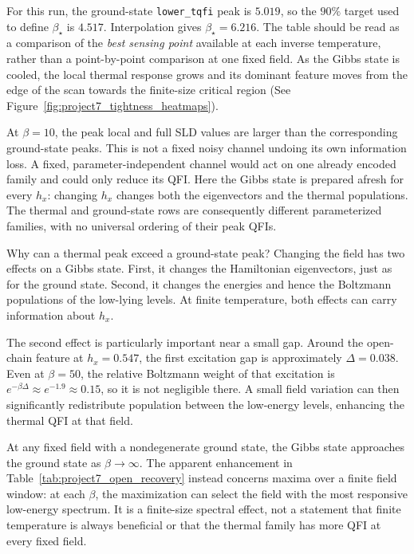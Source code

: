 For this run, the ground-state \texttt{lower\_tqfi} peak is $5.019$, so the $90\%$ target used to define $\beta_\star$ is $4.517$. Interpolation gives $\beta_\star=6.216$. The table should be read as a comparison of the \emph{best sensing point} available at each inverse temperature, rather than a point-by-point comparison at one fixed field. As the Gibbs state is cooled, the local thermal response grows and its dominant feature moves from the edge of the scan towards the finite-size critical region (See Figure~\ref{fig:project7_tightness_heatmaps}).

At $\beta=10$, the peak local and full SLD values are larger than the corresponding ground-state peaks. This is not a fixed noisy channel undoing its own information loss. A fixed, parameter-independent channel would act on one already encoded family and could only reduce its QFI. Here the Gibbs state is prepared afresh for every $h_x$: changing $h_x$ changes both the eigenvectors and the thermal populations. The thermal and ground-state rows are consequently different parameterized families, with no universal ordering of their peak QFIs.

\begin{infobox}{Why can a thermal peak exceed a ground-state peak?}
    Changing the field has two effects on a Gibbs state. First, it changes the Hamiltonian eigenvectors, just as for the ground state. Second, it changes the energies and hence the Boltzmann populations of the low-lying levels. At finite temperature, both effects can carry information about $h_x$.

    The second effect is particularly important near a small gap. Around the open-chain feature at $h_x=0.547$, the first excitation gap is approximately $\Delta=0.038$. Even at $\beta=50$, the relative Boltzmann weight of that excitation is $e^{-\beta\Delta}\approx e^{-1.9}\approx0.15$, so it is not negligible there. A small field variation can then significantly redistribute population between the low-energy levels, enhancing the thermal QFI at that field.

    At any fixed field with a nondegenerate ground state, the Gibbs state approaches the ground state as $\beta\rightarrow\infty$. The apparent enhancement in Table~\ref{tab:project7_open_recovery} instead concerns maxima over a finite field window: at each $\beta$, the maximization can select the field with the most responsive low-energy spectrum. It is a finite-size spectral effect, not a statement that finite temperature is always beneficial or that the thermal family has more QFI at every fixed field.
\end{infobox}


